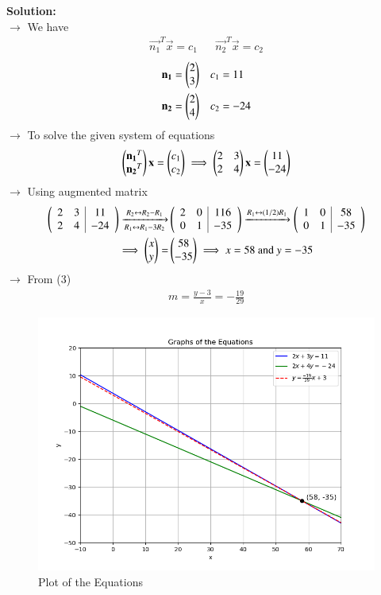 \documentclass[journal]{IEEEtran}
\begin{document}
\textbf{Solution:}\\
$\rightarrow$ We have
\begin{align*} \vec{n_1}^T\vec{x} = c_1 && \vec{n_2}^T\vec{x} = c_2 \end{align*}
\begin{align}
    \mathbf{n_1} = \begin{pmatrix}2\\3\end{pmatrix} && c_1 &= 11 \\
    \mathbf{n_2} = \begin{pmatrix}2\\4\end{pmatrix} && c_2 &= -24
\end{align}
$\rightarrow$ To solve the given system of equations
\begin{align}
    \begin{pmatrix}\mathbf{n_1}^T\\\mathbf{n_2}^T\end{pmatrix}\mathbf{x} = \begin{pmatrix}c_1\\c_2\end{pmatrix} \implies \begin{pmatrix}2&3\\2&4\end{pmatrix}\mathbf{x} = \begin{pmatrix}11\\-24\end{pmatrix}
\end{align}
$\rightarrow$ Using augmented matrix
\begin{align}
    \left(\begin{array}{cc|c} 2&3&11\\2&4&-24 \end{array}\right)
    \xrightarrow[R_1 \leftrightarrow R_1 - 3R_2]{R_2 \leftrightarrow R_2 - R_1} &\left(\begin{array}{cc|c} 2&0&116\\0&1&-35 \end{array}\right) \xrightarrow{R_1 \leftrightarrow (1/2)R_1} \left(\begin{array}{cc|c} 1&0&58\\0&1&-35 \end{array}\right) \\
    \implies \begin{pmatrix}x\\y\end{pmatrix} = &\begin{pmatrix}58\\-35\end{pmatrix} \implies x = 58 \text{ and } y = -35
\end{align}
$\rightarrow$ From (3)
\begin{align}
    m = \frac{y - 3}{x} = -\frac{19}{29}
\end{align}
\begin{figure}[h!]
   \centering
   \includegraphics[width=0.75\linewidth]{figs/01.png}
   \caption{Plot of the Equations}
   \label{Plot_1}
\end{figure}
\end{document}

